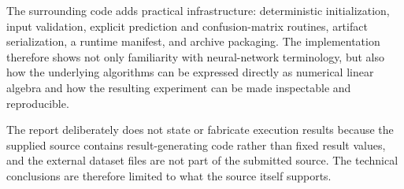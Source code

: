 \documentclass[11pt,a4paper]{article}
\begin{document}
The surrounding code adds practical infrastructure: deterministic initialization, input validation, explicit prediction and confusion-matrix routines, artifact serialization, a runtime manifest, and archive packaging. The implementation therefore shows not only familiarity with neural-network terminology, but also how the underlying algorithms can be expressed directly as numerical linear algebra and how the resulting experiment can be made inspectable and reproducible.

The report deliberately does not state or fabricate execution results because the supplied source contains result-generating code rather than fixed result values, and the external dataset files are not part of the submitted source. The technical conclusions are therefore limited to what the source itself supports.

\clearpage
\appendix
\end{document}
